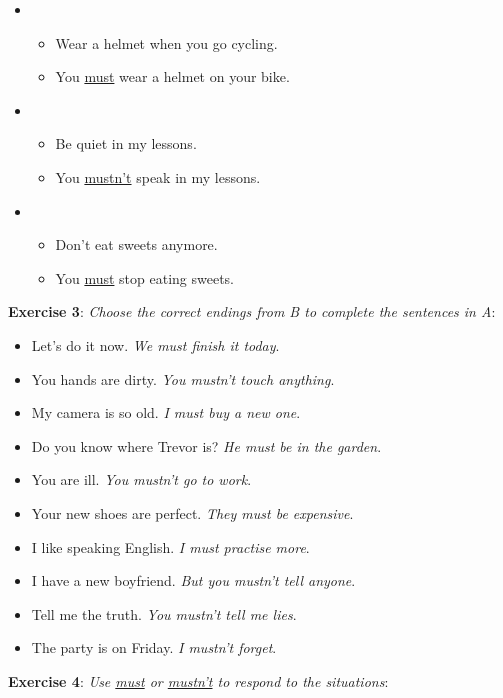 \begin{itemize}
\item
\begin{itemize}
\item Wear a helmet when you go cycling. 
\item You \underline{must} wear a helmet on your bike.
\end{itemize}

\item
\begin{itemize}
\item Be quiet in my lessons.
\item You \underline{mustn't} speak in my lessons.
\end{itemize}

\item
\begin{itemize}
\item Don't eat sweets anymore. 
\item You \underline{must} stop eating sweets.
\end{itemize}

\end{itemize}

\textbf{Exercise 3}: \textit{Choose the correct endings from B to complete the sentences in A}:

\begin{itemize}

\item Let's do it now. \textit{We must finish it today}.
\item You hands are dirty. \textit{You mustn't touch anything}.
\item My camera is so old. \textit{I must buy a new one}.
\item Do you know where Trevor is? \textit{He must be in the garden}.
\item You are ill. \textit{You mustn't go to work}.
\item Your new shoes are perfect. \textit{They must be expensive}.
\item I like speaking English. \textit{I must practise more}.
\item I have a new boyfriend. \textit{But you mustn't tell anyone}.
\item Tell me the truth. \textit{You mustn't tell me lies}.
\item The party is on Friday. \textit{I mustn't forget}.

\end{itemize}

\textbf{Exercise 4}: \textit{Use \underline{must} or \underline{mustn't} to respond to the situations}:

